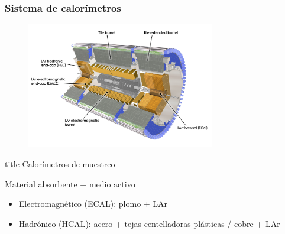 \documentclass[10pt, compress,spanish]{beamer}
\begin{document}
\begin{frame}[fragile]
\frametitle{Sistema de calorímetros}

\normalsize

\begin{figure}
\centering
\includegraphics[width=0.73\textwidth]{Cal-eps-converted-to.pdf}
\end{figure}

\begin{beamercolorbox}[leftskip=\titlelf]{title}
\normalsize Calorímetros de muestreo
\end{beamercolorbox}
Material absorbente + medio activo

\begin{itemize}

  \item Electromagnético (ECAL): plomo + LAr

  \item Hadrónico (HCAL): acero + tejas centelladoras plásticas / cobre + LAr

\end{itemize}




\end{frame}



\end{document}
